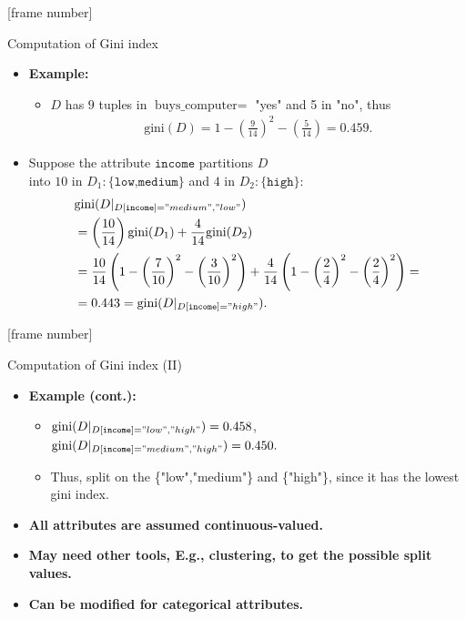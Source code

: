 \documentclass[aspectratio=169,t,table]{beamer}
\begin{document}
  {
    [frame number]
    \begin{frame}{Computation of Gini index}
      \begin{itemize}
        \item \textbf{Example:}
        \begin{itemize}
          \item $D$ has $9$ tuples in $\text{buys\_computer} =$ "yes" and 5 in "no", thus
          \begin{align}
            \text{gini}(D) = 1 - \left( \frac{9}{14} \right)^2 - \left( \frac{5}{14} \right) = 0.459.
          \end{align}
        \end{itemize}
        \item Suppose the attribute $\texttt{income}$ partitions $D$ \\ into $10$ in $D_1:\{\texttt{low,medium}\}$ and $4$ in $D_2: \{\texttt{high}\}$:
        \begin{align}
          &\text{gini}(D\vert_{D[\texttt{income}]="medium", "low"}) \\
          &= \left( \frac{10}{14} \right) \text{gini}(D_1) + \frac{4}{14} \text{gini}(D_2)\\
          &=\frac{10}{14} \left(1-\left( \frac{7}{10} \right)^2 - \left( \frac{3}{10} \right)^2 \right) + \frac{4}{14} \left( 1-\left( \frac{2}{4} \right)^2 - \left( \frac{2}{4} \right)^2 \right) =\\
          &= 0.443 = \text{gini}(D\vert_{D[\texttt{income}]="high"}).
        \end{align}
      \end{itemize}
    \end{frame}
  }

  {
    [frame number]
    \begin{frame}{Computation of Gini index (II)}
      \begin{itemize}
        \item \textbf{Example (cont.):}
        \begin{itemize}
          \item $\text{gini}(D\vert_{D[\texttt{income}]="low", "high"}) = 0.458$,\\
                $\text{gini}(D\vert_{D[\texttt{income}]="medium", "high"}) = 0.450.$
          \item Thus, split on the \{"low","medium"\} and \{"high"\}, since it has the lowest gini index.
        \end{itemize}
        \item \textbf{All attributes are assumed continuous-valued.}
        \item \textbf{May need other tools, E.g., clustering, to get the possible split values.}
        \item \textbf{Can be modified for categorical attributes.}
      \end{itemize}
    \end{frame}
  }
\end{document}
